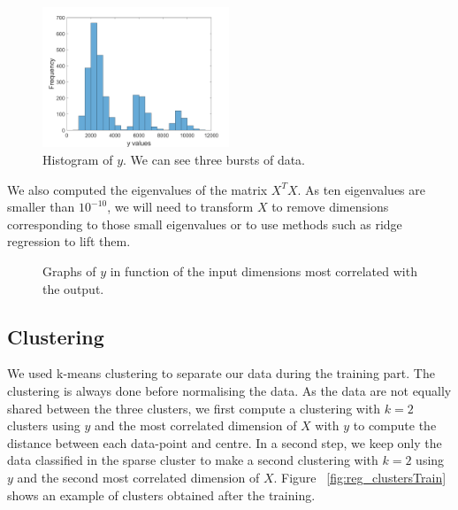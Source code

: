 \documentclass{article} %
\begin{document}
\begin{figure}[!h] %
	\center
	\includegraphics[width=2.2in]{figures/y_histogram.png}
	\caption{Histogram of $y$. We can see three bursts of data.}
	\label{fig:reg_yHistogram}
\end{figure}

We also computed the eigenvalues of the matrix $X^T X$. As ten eigenvalues are smaller than $10^{-10}$, we will need to transform $X$ to remove dimensions corresponding to those small eigenvalues or to use methods such as ridge regression to lift them. 

\begin{figure}[!h] %
\center
{}
\hfill
{}
\caption{Graphs of $y$ in function of the input dimensions most correlated with the output.}
\end{figure}

\subsection{Clustering}
We used k-means clustering to separate our data during the training part. The clustering is always done before normalising the data.
As the data are not equally shared between the three clusters, we first compute a clustering with $k=2$ clusters using $y$ and the most correlated dimension of $X$ with $y$ to compute the distance between each data-point and centre. In a second step, we keep only the data classified in the sparse cluster to make a second clustering with $k=2$ using $y$ and the second most correlated dimension of $X$. Figure ~\ref{fig:reg_clustersTrain} shows an example of clusters obtained after the training.
\end{document}
